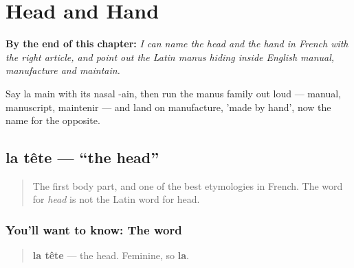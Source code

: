 
\chapter{Head and Hand}
\label{ch:fr-head-and-hand}

\begin{chapteropening}
\textbf{By the end of this chapter:} \emph{I can name the head and the hand in French with the right article, and point out the Latin manus hiding inside English manual, manufacture and maintain.}

Say la main with its nasal -ain, then run the manus family out loud — manual, manuscript, maintenir — and land on manufacture, 'made by hand', now the name for the opposite.
\end{chapteropening}

\section[la tête]{la tête — \textquotedblleft{}the head\textquotedblright{}}

\label{lesson:FR-C17-tete}



\begin{quote}
The first body part, and one of the best etymologies in French. The word for \emph{head} is not the Latin word for head.
\end{quote}

\subsection*{You'll want to know: The word}
\begin{quote}
\textbf{la tête} — the head. Feminine, so \textbf{la}.
\end{quote}

